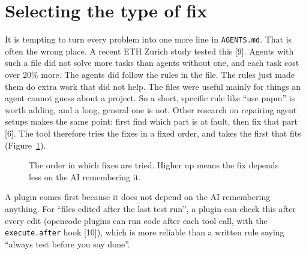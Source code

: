 \documentclass[10pt,twocolumn]{article}
\begin{document}
\section{Selecting the type of fix}
It is tempting to turn every problem into one more line in \texttt{AGENTS.md}. That is often the wrong place. A recent ETH Zurich study tested this [9]. Agents with such a file did not solve more tasks than agents without one, and each task cost over 20\% more. The agents did follow the rules in the file. The rules just made them do extra work that did not help. The files were useful mainly for things an agent cannot guess about a project. So a short, specific rule like ``use pnpm'' is worth adding, and a long, general one is not. Other research on repairing agent setups makes the same point: first find which part is at fault, then fix that part [6]. The tool therefore tries the fixes in a fixed order, and takes the first that fits (Figure~\ref{fig:ladder}).

\begin{figure}[h]
\centering
{}
\caption{The order in which fixes are tried. Higher up means the fix depends less on the AI remembering it.}
\label{fig:ladder}
\end{figure}

A plugin comes first because it does not depend on the AI remembering anything. For ``files edited after the last test run'', a plugin can check this after every edit (opencode plugins can run code after each tool call, with the \texttt{execute.after} hook [10]), which is more reliable than a written rule saying ``always test before you say done''.
\end{document}
